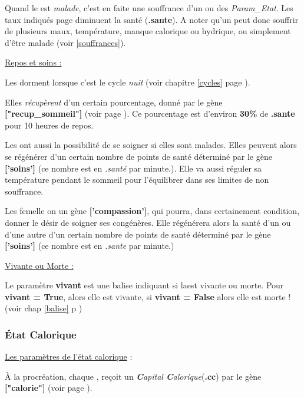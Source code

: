 \documentclass[french]{report}
\begin{document}
Quand le \CoCiX est \textit{malade}, c'est en faite une souffrance d'un ou des \textit{Param\_Etat}. Les taux indiqués page \pageref{souffrances} diminuent la santé (\textbf{.sante}). A noter qu'un \CoCiX peut donc souffrir de plusieurs maux, température, manque calorique ou hydrique, ou simplement d'être malade (voir \ref{souffrances}).

\begin{center}
	\underline{Repos et soins :}\label{repos}
\end{center}
Les \CoCiX dorment lorsque c'est le cycle \textit{nuit} (voir chapitre \ref{cycles} page \pageref{cycles}).

Elles \textit{récupèrent} d'un certain pourcentage, donné par le gène \textbf{["recup\_sommeil"]} (voir page \pageref{liste_gene}). Ce pourcentage est d'environ \textbf{30\%} de \textbf{.sante} pour 10 heures de repos.

Les \CoCiX ont aussi la possibilité de se soigner si elles sont malades. Elles peuvent alors se régénérer d'un certain nombre de points de santé déterminé par le gène \textbf{['soins']} (ce nombre est en \textit{.santé} par minute.). Elle va aussi réguler sa température pendant le sommeil pour l'équilibrer dans ses limites de non souffrance.

Les \CoCiX femelle on un gène \textbf{['compassion']}, qui pourra, dans certainement condition, donner le désir de soigner ses congénères. Elle régénérera alors la santé d'un ou d'une autre \CoCiX d'un certain nombre de points de santé déterminé par le gène \textbf{['soins']} (ce nombre est en \textit{.sante} par minute.)

\begin{center}
	\underline{Vivante ou Morte :}
\end{center}
Le paramètre \textbf{vivant} est une balise indiquant si la\CoCiX est vivante ou morte. Pour \textbf{vivant = True}, alors elle est vivante, si \textbf{vivant = False} alors elle est morte !(voir chap \ref{balise} p \pageref{balise})\\

\subsubsection{État Calorique}\label{alimentation}
\begin{center}
	\underline{Les paramètres de l'état calorique} :\label{cc}
\end{center}
À la procréation, chaque \CoCiX, reçoit un \textit{\textbf{C}apital \textbf{C}alorique}(\textbf{.cc}) par le gène \textbf{["calorie"]} (voir page \pageref{liste_gene}).\\
\end{document}
